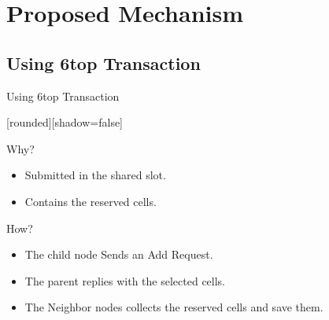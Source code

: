 \section{Proposed Mechanism}

\subsection{Using 6top Transaction}
\begin{withoutheadline}
\begin{frame}{Using 6top Transaction}


[rounded][shadow=false]

\begin{block}{Why?}
    \begin{itemize}
    \item  Submitted in the shared slot.
    \item Contains the reserved cells.
    \end{itemize}
    \end{block}


\begin{block}{How?}
    \begin{itemize}
    \item The child node Sends an Add Request.
    \item<2-> The parent replies with the selected cells.
    \item<3-> The Neighbor nodes collects the reserved cells and save them. 
    \end{itemize}
    \end{block}
    
    
\begin{figure}[p]


\end{figure}
\end{frame}
\end{withoutheadline}
